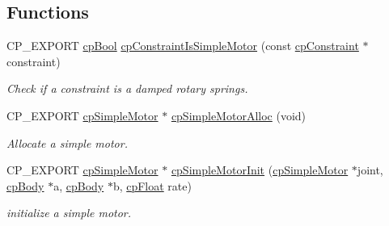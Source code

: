 \subsection*{Functions}
\begin{DoxyCompactItemize}
\item 
\mbox{\label{group__cp_simple_motor_ga955e2e174d2a348ae20c07d7ea356d42}} 
C\+P\+\_\+\+E\+X\+P\+O\+RT \mbox{\hyperlink{group__basic_types_gabc5e752c48f3449ca26ef413ecbd647e}{cp\+Bool}} \mbox{\hyperlink{group__cp_simple_motor_ga955e2e174d2a348ae20c07d7ea356d42}{cp\+Constraint\+Is\+Simple\+Motor}} (const \mbox{\hyperlink{structcp_constraint}{cp\+Constraint}} $\ast$constraint)
\begin{DoxyCompactList}\small\item\em Check if a constraint is a damped rotary springs. \end{DoxyCompactList}\item 
\mbox{\label{group__cp_simple_motor_gacf8c359c68b23fd983c5b6159bd09a82}} 
C\+P\+\_\+\+E\+X\+P\+O\+RT \mbox{\hyperlink{structcp_simple_motor}{cp\+Simple\+Motor}} $\ast$ \mbox{\hyperlink{group__cp_simple_motor_gacf8c359c68b23fd983c5b6159bd09a82}{cp\+Simple\+Motor\+Alloc}} (void)
\begin{DoxyCompactList}\small\item\em Allocate a simple motor. \end{DoxyCompactList}\item 
\mbox{\label{group__cp_simple_motor_gab38b0a428a590f88c354ea77c3baefee}} 
C\+P\+\_\+\+E\+X\+P\+O\+RT \mbox{\hyperlink{structcp_simple_motor}{cp\+Simple\+Motor}} $\ast$ \mbox{\hyperlink{group__cp_simple_motor_gab38b0a428a590f88c354ea77c3baefee}{cp\+Simple\+Motor\+Init}} (\mbox{\hyperlink{structcp_simple_motor}{cp\+Simple\+Motor}} $\ast$joint, \mbox{\hyperlink{structcp_body}{cp\+Body}} $\ast$a, \mbox{\hyperlink{structcp_body}{cp\+Body}} $\ast$b, \mbox{\hyperlink{group__basic_types_gac1ed65573e035bf892505768c852d8d3}{cp\+Float}} rate)
\begin{DoxyCompactList}\small\item\em initialize a simple motor. \end{DoxyCompactList}\item 
\mbox{\label{group__cp_simple_motor_ga397f20104311c7f5427cc6d5daa7191e}} 

\end{DoxyCompactItemize}
